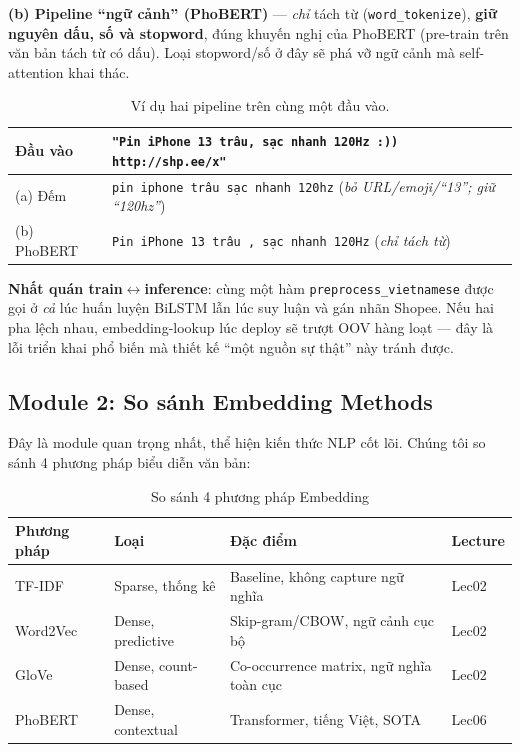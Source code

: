 \documentclass[12pt,a4paper]{article}
\begin{document}
\noindent\textbf{(b) Pipeline ``ngữ cảnh'' (PhoBERT)} --- \textit{chỉ} tách từ (\texttt{word\_tokenize}), \textbf{giữ nguyên dấu, số và stopword}, đúng khuyến nghị của PhoBERT (pre-train trên văn bản tách từ có dấu). Loại stopword/số ở đây sẽ phá vỡ ngữ cảnh mà self-attention khai thác.

\begin{table}[H]
\centering\small
\caption{Ví dụ hai pipeline trên cùng một đầu vào.}
\renewcommand{\arraystretch}{1.25}
\begin{tabular}{p{2.6cm}p{9.5cm}}
\toprule
\textbf{Đầu vào} & \multicolumn{1}{l}{\texttt{"Pin iPhone 13 trâu, sạc nhanh 120Hz :)) http://shp.ee/x"}} \\
\midrule
(a) Đếm & \texttt{pin iphone trâu sạc nhanh 120hz} \;(\textit{bỏ URL/emoji/``13''; giữ ``120hz''}) \\
(b) PhoBERT & \texttt{Pin iPhone 13 trâu , sạc nhanh 120Hz} \;(\textit{chỉ tách từ}) \\
\bottomrule
\end{tabular}
\end{table}

\noindent\textbf{Nhất quán train$\leftrightarrow$inference}: cùng một hàm \texttt{preprocess\_vietnamese} được gọi ở \textit{cả} lúc huấn luyện BiLSTM lẫn lúc suy luận và gán nhãn Shopee. Nếu hai pha lệch nhau, embedding-lookup lúc deploy sẽ trượt OOV hàng loạt --- đây là lỗi triển khai phổ biến mà thiết kế ``một nguồn sự thật'' này tránh được.

\subsection{Module 2: So sánh Embedding Methods}
\label{sec:module2idx}

Đây là module quan trọng nhất, thể hiện kiến thức NLP cốt lõi. Chúng tôi so sánh 4 phương pháp biểu diễn văn bản:

\begin{table}[H]
\centering
\caption{So sánh 4 phương pháp Embedding}
\begin{tabular}{llll}
\toprule
\textbf{Phương pháp} & \textbf{Loại} & \textbf{Đặc điểm} & \textbf{Lecture} \\
\midrule
TF-IDF & Sparse, thống kê & Baseline, không capture ngữ nghĩa & Lec02 \\
Word2Vec & Dense, predictive & Skip-gram/CBOW, ngữ cảnh cục bộ & Lec02 \\
GloVe & Dense, count-based & Co-occurrence matrix, ngữ nghĩa toàn cục & Lec02 \\
PhoBERT & Dense, contextual & Transformer, tiếng Việt, SOTA & Lec06 \\
\bottomrule
\end{tabular}
\end{table}
\end{document}
